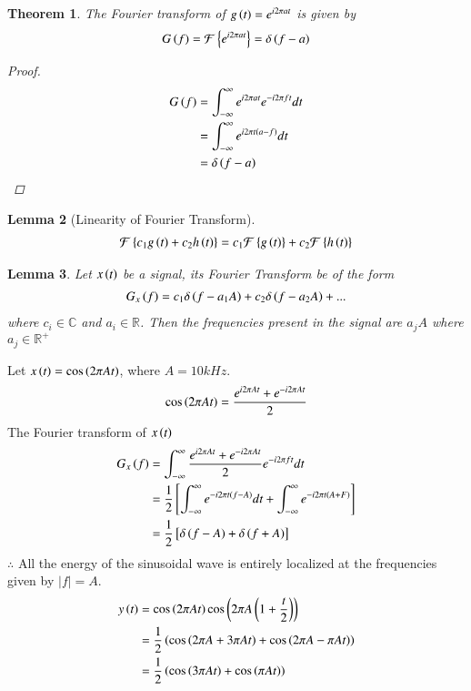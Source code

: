 \documentclass[journal,12pt,twocolumn]{IEEEtran}
\newtheorem{theorem}{Theorem}[section]
\newtheorem{lemma}[theorem]{Lemma}
\begin{document}
\begin{theorem}
The Fourier transform of $g\left(t\right)=e^{i2\pi at}$ is given by 
\begin{align}
    G\left(f\right)=\mathcal{F}\left\{e^{i2\pi at}\right\}=\delta\left(f-a\right)
\end{align}
\begin{proof}
 \begin{align}
     G\left(f\right)&=\int_{-\infty}^{\infty}e^{i2\pi at}e^{-i2\pi ft}dt\\
     &=\int_{-\infty}^{\infty}e^{i2\pi t\left(a-f\right)}dt\\
     &=\delta\left(f-a\right)
 \end{align}
\end{proof}
\end{theorem}
\begin{lemma}[Linearity of Fourier Transform]
\begin{align}
    \mathcal{F}\left\{c_1g\left(t\right)+c_2h\left(t\right)\right\}=c_1\mathcal{F}\left\{g\left(t\right)\right\}+c_2\mathcal{F}\left\{h\left(t\right)\right\}
\end{align}
\end{lemma}
\begin{lemma}\label{fre}
Let $x\left(t\right)$ be a signal, its Fourier Transform  be of the form
\begin{align}
    G_x\left(f\right)=c_1\delta\left(f-a_1A\right)+c_2\delta\left(f-a_2A\right)+...
\end{align}
where $c_i\in \mathbb{C}$ and $a_i\in \mathbb{R}$. 
Then the frequencies present in the signal are $a_jA $ where $a_j\in \mathbb{R}^{+}$
\end{lemma}
Let $x\left(t\right)=\cos{\ensuremath{\left(2\pi At\right)}}$, where $A=10kHz$.
\begin{align}
  \cos{\ensuremath{\left(2\pi At\right)}}=\frac{e^{i2\pi At}+e^{-i2\pi At}}{2}  
\end{align}
The Fourier transform of $x\left(t\right)$ 
\begin{align}
    G_x\left(f\right)&=\int_{-\infty}^{\infty}\frac{e^{i2\pi At}+e^{-i2\pi At}}{2}e^{-i2\pi ft}dt\\
    &=\frac{1}{2}{}\left[\int_{-\infty}^{\infty}e^{-i2\pi t(f-A)}dt+\int_{-\infty}^{\infty}e^{-i2\pi t(A+F)}\right]\\
    &=\frac{1}{2}{}\left[\delta\left(f-A\right)+\delta\left(f+A\right)\right]
\end{align}
$\therefore$ All the energy of the sinusoidal wave is  entirely localized at the frequencies given by $|f|=A$.
\begin{align}
    y\left(t\right)&=\cos{\ensuremath{\left(2\pi At\right)}}\cos{\ensuremath{\left(2\pi A\left(1+\frac{t}{2}\right)\right)}}\\
    &=\frac{1}{2}\left(\cos{\ensuremath{\left(2\pi A+3\pi At\right)}}+\cos{\ensuremath{\left(2\pi A-\pi At\right)}}\right)\\
    &=\frac{1}{2}\left(\cos{\ensuremath{\left(3\pi At\right)}}+\cos{\ensuremath{\left(\pi At\right)}}\label{yt}\right)
\end{align}
\end{document}
